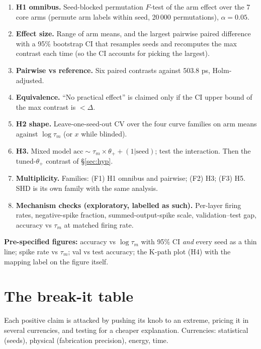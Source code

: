 \documentclass[10pt,a4paper]{article}
\newcommand{\taum}{\tau_m}
\newcommand{\ptn}{\Delta}
\begin{document}
\begin{enumerate}
\item \textbf{H1 omnibus.} Seed-blocked permutation $F$-test of the arm effect over the 7 core arms (permute arm labels within seed, 20\,000 permutations), $\alpha=0.05$.
\item \textbf{Effect size.} Range of arm means, and the largest pairwise paired difference with a 95\% bootstrap CI that resamples seeds and recomputes the max contrast each time (so the CI accounts for picking the largest).
\item \textbf{Pairwise vs reference.} Six paired contrasts against 503.8 ps, Holm-adjusted.
\item \textbf{Equivalence.} ``No practical effect'' is claimed only if the CI upper bound of the max contrast is $<\ptn$.
\item \textbf{H2 shape.} Leave-one-seed-out CV over the four curve families on arm means against $\log\taum$ (or $x$ while blinded).
\item \textbf{H3.} Mixed model $\text{acc}\sim\taum\times\theta_++(1|\text{seed})$; test the interaction. Then the tuned-$\theta_+$ contrast of \S\ref{sec:hyp}.
\item \textbf{Multiplicity.} Families: (F1) H1 omnibus and pairwise; (F2) H3; (F3) H5. SHD is its own family with the same analysis.
\item \textbf{Mechanism checks (exploratory, labelled as such).} Per-layer firing rates, negative-spike fraction, summed-output-spike scale, validation--test gap, accuracy vs $\taum$ at matched firing rate.
\end{enumerate}
\textbf{Pre-specified figures:} accuracy vs $\log\taum$ with 95\% CI \emph{and} every seed as a thin line; spike rate vs $\taum$; val vs test accuracy; the K-path plot (H4) with the mapping label on the figure itself.

\section{The break-it table}\label{sec:break}
Each positive claim is attacked by pushing its knob to an extreme, pricing it in several currencies, and testing for a cheaper explanation. Currencies: statistical (seeds), physical (fabrication precision), energy, time.
\end{document}
